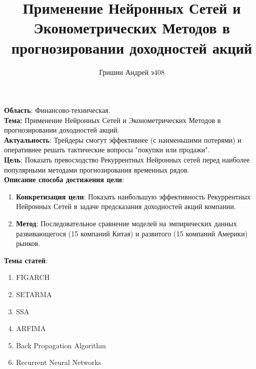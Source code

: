 \documentclass[a4paper]{article}
\title{Применение Нейронных Сетей и Эконометрических Методов в прогнозировании доходностей акций}
\author{Гришин Андрей э408}
\begin{document}
	\maketitle
	
	\noindent \textbf{Область}: Финансово-техническая.\\
	
	\noindent \textbf{Тема:} Применение Нейронных Сетей и Эконометрических Методов в прогнозировании доходностей акций.\\
	
	\noindent \textbf{Актуальность}: Трейдеры смогут эффективнее (с наименьшими потерями) и оперативнее решать тактические вопросы "покупки или продажи".\\
	
	\noindent \textbf{Цель}: Показать превосходство Рекуррентных Нейронных сетей перед наиболее популярными методами прогнозирования временных рядов.\\
	
	\noindent \textbf{Описание способа достижения цели}:
		\begin{enumerate}
			\item \textbf{Конкретизация цели}: Показать наибольшую эффективность Рекуррентных Нейронных Сетей в задаче предсказания доходностей акций компании.
			\item \textbf{Метод}: Последовательное сравнение моделей на эмпирических данных развивающегося (15 компаний Китая) и развитого (15 компаний Америки) рынков.
		\end{enumerate}
	
	\noindent \textbf{Темы статей}:
		\begin{enumerate}
			\item FIGARCH \cite{figarch}
			\item SETARMA \cite{setarma}
			\item SSA \cite{ssa} \cite{ssa_2}
			\item ARFIMA \cite{arfima}
			\item Back Propagation Algorithm \cite{backpropagation}
			\item Recurrent Neural Networks \cite{rnn}
		\end{enumerate}
	
	
	
	
\end{document}
